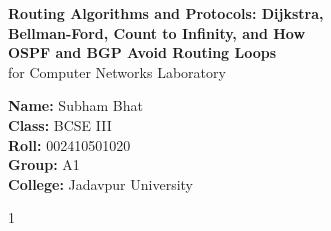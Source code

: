 \documentclass[11pt,a4paper]{article}
\begin{document}
\begin{titlepage}
    \centering
    \vspace*{4.2cm}

    {\LARGE \textbf{Routing Algorithms and Protocols: Dijkstra,}}\\[0.7em]
    {\LARGE \textbf{Bellman-Ford, Count to Infinity, and How}}\\[0.7em]
    {\LARGE \textbf{OSPF and BGP Avoid Routing Loops}}\\[1.4em]

    {\large for Computer Networks Laboratory}

    \vspace{3.8cm}

    {\large
    \textbf{Name:} Subham Bhat\\[0.55em]
    \textbf{Class:} BCSE III\\[0.55em]
    \textbf{Roll:} 002410501020\\[0.55em]
    \textbf{Group:} A1\\[0.55em]
    \textbf{College:} Jadavpur University
    }

    \vfill
    {\normalsize 1}
\end{titlepage}

\setcounter{page}{2}
\tableofcontents
\newpage

\setcounter{page}{3}
\end{document}

